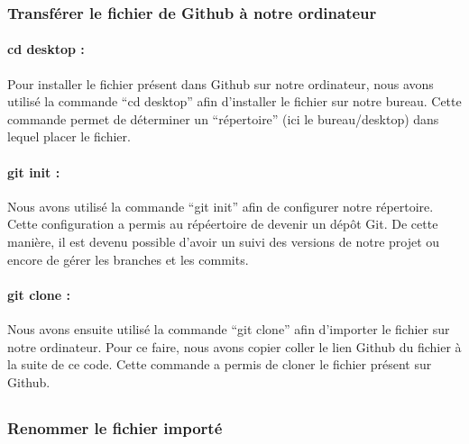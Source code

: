 \documentclass[
  letterpaper,
  DIV=11,
  numbers=noendperiod]{scrartcl}
\let\oldparagraph\paragraph
\renewcommand{\paragraph}[1]{\oldparagraph{#1}\mbox{}}
\begin{document}
\hypertarget{transfuxe9rer-le-fichier-de-github-uxe0-notre-ordinateur}{%
\subsubsection{Transférer le fichier de Github à notre
ordinateur}\label{transfuxe9rer-le-fichier-de-github-uxe0-notre-ordinateur}}

\hypertarget{cd-desktop}{%
\paragraph{cd desktop :}\label{cd-desktop}}

Pour installer le fichier présent dans Github sur notre ordinateur, nous
avons utilisé la commande ``cd desktop'' afin d'installer le fichier sur
notre bureau. Cette commande permet de déterminer un ``répertoire'' (ici
le bureau/desktop) dans lequel placer le fichier.

\hypertarget{git-init}{%
\paragraph{git init :}\label{git-init}}

Nous avons utilisé la commande ``git init'' afin de configurer notre
répertoire. Cette configuration a permis au répéertoire de devenir un
dépôt Git. De cette manière, il est devenu possible d'avoir un suivi des
versions de notre projet ou encore de gérer les branches et les commits.

\hypertarget{git-clone}{%
\paragraph{git clone :}\label{git-clone}}

Nous avons ensuite utilisé la commande ``git clone'' afin d'importer le
fichier sur notre ordinateur. Pour ce faire, nous avons copier coller le
lien Github du fichier à la suite de ce code. Cette commande a permis de
cloner le fichier présent sur Github.

\hypertarget{section}{%
\subsection{}\label{section}}

\hypertarget{renommer-le-fichier-importuxe9}{%
\subsubsection{Renommer le fichier
importé}\label{renommer-le-fichier-importuxe9}}
\end{document}
